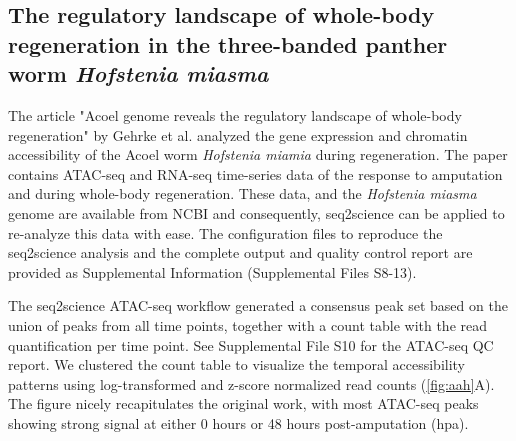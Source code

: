 \subsection{The regulatory landscape of whole-body regeneration in the three-banded panther worm \textit{Hofstenia miasma}}

The article "Acoel genome reveals the regulatory landscape of whole-body regeneration" by Gehrke et al. analyzed the gene expression and chromatin accessibility of the Acoel worm \textit{Hofstenia miamia} \cite{Gehrke2019} during regeneration. The paper contains ATAC-seq and RNA-seq time-series data of the response to amputation and during whole-body regeneration. These data, and the \textit{Hofstenia miasma} genome are available from NCBI and consequently, seq2science can be applied to re-analyze this data with ease. The configuration files to reproduce the seq2science analysis and the complete output and quality control report are provided as Supplemental Information (Supplemental Files S8-13).

The seq2science ATAC-seq workflow generated a consensus peak set based on the union of peaks from all time points, together with a count table with the read quantification per time point. See Supplemental File S10 for the ATAC-seq QC report. We clustered the count table to visualize the temporal accessibility patterns using log-transformed and z-score normalized read counts (\autoref{fig:aah}A). The figure nicely recapitulates the original work, with most ATAC-seq peaks showing strong signal at either 0 hours or 48 hours post-amputation (hpa).

